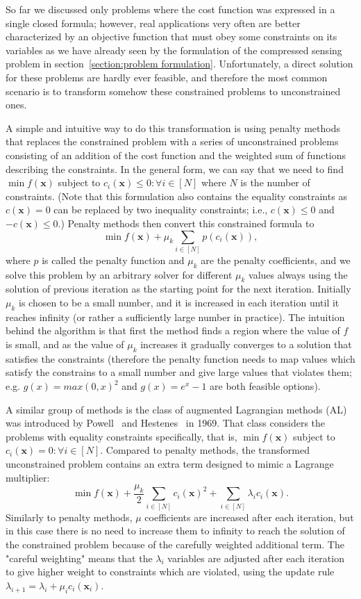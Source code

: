 So far we discussed only problems where the cost function was expressed in a single closed formula; however, real applications very often are better characterized by an objective function that must obey some constraints on its variables as we have already seen by the formulation of the compressed sensing problem in section~\ref{section:problem formulation}. Unfortunately, a direct solution for these problems are hardly ever feasible, and therefore the most common scenario is to transform somehow these constrained problems to unconstrained ones.

A simple and intuitive way to do this transformation is using penalty methods that replaces the constrained problem with a series of unconstrained problems consisting of an addition of the cost function and the weighted sum of functions describing the constraints. In the general form, we can say that we need to find $\min f(\mathbf{x})$ subject to $c_i(\mathbf{x}) \le 0 : \forall i \in [N]$ where $N$ is the number of constraints. (Note that this formulation also contains the equality constraints as $c(\mathbf{x}) = 0$ can be replaced by two inequality constraints; i.e., $c(\mathbf{x}) \le 0$ and $-c(\mathbf{x}) \le 0$.) Penalty methods then convert this constrained formula to
\[\min f(\mathbf{x}) + \mu_k \sum_{i \in [N]} p(c_i(\mathbf{x})),\]
where $p$ is called the penalty function and $\mu_k$ are the penalty coefficients, and we solve this problem by an arbitrary solver for different $\mu_k$ values always using the solution of previous iteration as the starting point for the next iteration. Initially $\mu_k$ is chosen to be a small number, and it is increased in each iteration until it reaches infinity (or rather a sufficiently large number in practice). The intuition behind the algorithm is that first the method finds a region where the value of $f$ is small, and as the value of $\mu_k$ increases it gradually converges to a solution that satisfies the constraints (therefore the penalty function needs to map values which satisfy the constrains to a small number and give large values that violates them; e.g. $g(x) = max(0, x)^2$ and $g(x) = e^x - 1$ are both feasible options).

A similar group of methods is the class of augmented Lagrangian methods (AL) was introduced by Powell~\cite{powell_method_1969} and Hestenes~\cite{hestenes_multiplier_1969} in 1969. That class considers the problems with equality constraints specifically, that is, $\min f(\mathbf{x})$ subject to $c_i(\mathbf{x}) = 0 : \forall i \in [N]$. Compared to penalty methods, the transformed unconstrained problem contains an extra term designed to mimic a Lagrange multiplier:
\[\min f(\mathbf{x}) + \frac{\mu_k}{2} \sum_{i \in [N]} c_i(\mathbf{x})^2 + \sum_{i \in [N]} \lambda_i c_i(\mathbf{x}).\]
Similarly to penalty methods, $\mu$ coefficients are increased after each iteration, but in this case there is no need to increase them to infinity to reach the solution of the constrained problem because of the carefully weighted additional term. The "careful weighting" means that the $\lambda_i$ variables are adjusted after each iteration to give higher weight to constraints which are violated, using the update rule $\lambda_{i+1} = \lambda_i + \mu_i c_i(\mathbf{x}_i)$.

